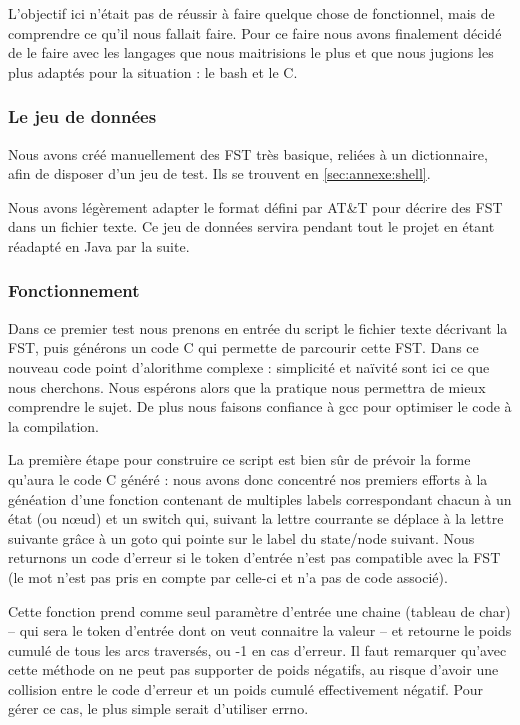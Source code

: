 L'objectif ici n'était pas de réussir à faire quelque chose de fonctionnel, mais de comprendre
ce qu'il nous fallait faire. Pour ce faire nous avons finalement décidé de le faire avec les
langages que nous maitrisions le plus et que nous jugions les plus adaptés pour la situation : le
bash et le C.

\subsubsection{Le jeu de données}

Nous avons créé manuellement des FST très basique, reliées à un dictionnaire, afin de disposer
d'un jeu de test. Ils se trouvent en \autoref{sec:annexe:shell}.

Nous avons légèrement adapter le format défini par AT\&T pour décrire des FST dans un fichier texte.
Ce jeu de données servira pendant tout le projet en étant réadapté en Java par la suite.

\subsubsection{Fonctionnement}

Dans ce premier test nous prenons en entrée du script le fichier texte décrivant la FST,
puis générons un code C qui permette de parcourir cette FST.
Dans ce nouveau code point d'alorithme complexe : simplicité et naïvité sont ici ce que nous cherchons.
Nous espérons alors que la pratique nous permettra
de mieux comprendre le sujet.
De plus nous faisons confiance à gcc pour optimiser le code à la compilation.


La première étape pour construire ce script est bien sûr de prévoir la forme qu'aura le code C généré :
nous avons donc concentré nos premiers efforts à la généation d'une fonction contenant de multiples labels
correspondant chacun à un état (ou n\oe ud) et un switch qui, suivant la lettre courrante
se déplace à la lettre suivante grâce à un goto qui pointe sur le label du state/node suivant.
Nous returnons un code d'erreur si le token d'entrée n'est pas compatible avec la FST (le mot n'est pas
pris en compte par celle-ci et n'a pas de code associé).



Cette fonction prend comme seul paramètre d'entrée une chaine (tableau de char) --
qui sera le token d'entrée dont on veut connaitre la valeur -- et retourne le poids cumulé de
tous les arcs traversés, ou -1 en cas d'erreur.
Il faut remarquer qu'avec cette méthode on ne peut pas supporter de poids négatifs,
au risque d'avoir une collision entre le code d'erreur et un poids cumulé effectivement négatif.
Pour gérer ce cas, le plus simple serait d'utiliser errno.

